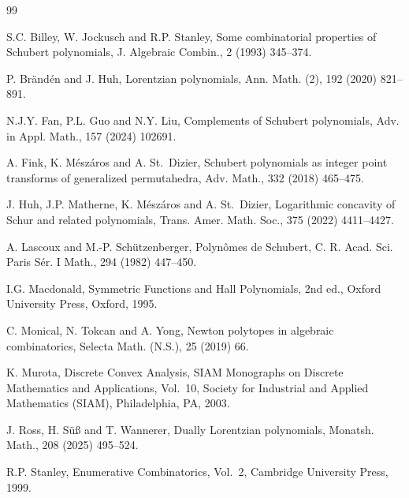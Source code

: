 \documentclass[11pt]{article}
\theoremstyle{definition}
\begin{document}
\begin{thebibliography}{99}

S.C. Billey, W. Jockusch and R.P. Stanley,
Some combinatorial properties of Schubert polynomials,
J. Algebraic Combin., 2 (1993) 345--374.

P. Br\"and\'en and J. Huh,
Lorentzian polynomials,
Ann. Math. (2), 192 (2020) 821--891.

N.J.Y. Fan, P.L. Guo and N.Y. Liu,
Complements of Schubert polynomials,
Adv. in Appl. Math., 157 (2024) 102691.

A. Fink, K. M\'esz\'aros and A. St.~Dizier,
Schubert polynomials as integer point transforms of generalized permutahedra,
Adv. Math., 332 (2018) 465--475.

J. Huh, J.P. Matherne, K. M\'esz\'aros and A. St.~Dizier,
Logarithmic concavity of Schur and related polynomials,
Trans. Amer. Math. Soc., 375 (2022) 4411--4427.

A. Lascoux and M.-P. Sch\"utzenberger,
Polyn\^omes de Schubert,
C. R. Acad. Sci. Paris S\'er. I Math., 294 (1982) 447--450.

I.G. Macdonald,
Symmetric Functions and Hall Polynomials, 2nd ed.,
Oxford University Press, Oxford, 1995.

C. Monical, N. Tokcan and A. Yong,
Newton polytopes in algebraic combinatorics,
Selecta Math. (N.S.), 25 (2019) 66.

K. Murota,
Discrete Convex Analysis,
SIAM Monographs on Discrete Mathematics and Applications, Vol.~10,
Society for Industrial and Applied Mathematics (SIAM), Philadelphia, PA,
2003.

J. Ross, H. S\"u\ss{} and T. Wannerer,
Dually Lorentzian polynomials,
Monatsh. Math., 208 (2025) 495--524.

R.P. Stanley,
Enumerative Combinatorics, Vol.~2,
Cambridge University Press, 1999.

\end{thebibliography}
\end{document}
